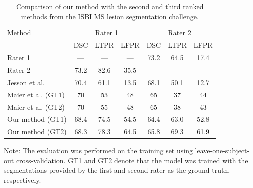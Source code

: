 \begin{table}
\caption{Comparison of our method with the second and third ranked methods from
the ISBI MS lesion segmentation challenge.}
\begin{center}
% 
\begin{tabular}{@{}lcccccc@{}}
\toprule
Method &
\multicolumn{3}{c}{Rater 1} &
\multicolumn{3}{c}{Rater 2} \\
& DSC & LTPR & LFPR & DSC & LTPR & LFPR \\
\midrule
Rater 1 & --- & --- & --- & 73.2 & 64.5 & 17.4 \\
Rater 2 & 73.2 & 82.6 & 35.5 & --- & --- & --- \\
Jesson et al. &  70.4 & 61.1 & 13.5 & 68.1 & 50.1 & 12.7 \\
Maier et al. (GT1) & 70 & 53 & 48 & 65 & 37 & 44 \\
Maier et al. (GT2) & 70 & 55 & 48 & 65 & 38 & 43 \\
Our method (GT1) & 68.4 & 74.5 & 54.5 & 64.4 & 63.0 & 52.8 \\
Our method (GT2) & 68.3 & 78.3 & 64.5 & 65.8 & 69.3 & 61.9 \\
\bottomrule
\end{tabular}
\end{center}
Note: The evaluation was performed on the training set using
leave-one-subject-out cross-validation. GT1 and GT2 denote that the model was
trained with the segmentations provided by the first and second rater as the
ground truth, respectively.
\end{table}

